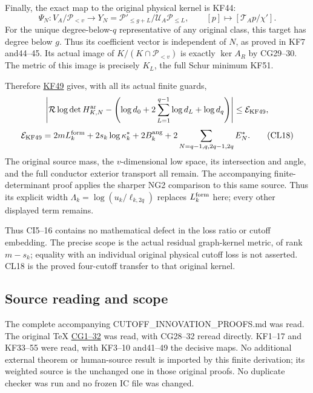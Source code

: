 \documentclass[11pt]{article}
\begin{document}
Finally, the exact map to the original physical kernel is KF44: \[
\Psi_N:V_A/\mathcal P_{<v}\longrightarrow
Y_N=\mathcal P'_{\le g+L}/\mathcal U_A\mathcal P_{\le L},
\qquad[p]\longmapsto[\mathcal T_Ap/\chi'].
\] For the unique degree-below-\(q\) representative of any original class, this target has degree below \(g\). Thus its coefficient vector is independent of \(N\), as proved in KF7 and44--45. Its actual image of \(K/(K\cap\mathcal P_{<v})\) is exactly \(\ker A_R\) by CG29--30. The metric of this image is precisely \(K_L\), the full Schur minimum KF51.

Therefore \href{https://github.com/KokunoYumeto/zeta-function-research-reader/blob/0fd693c844aad9117e30ec447c59864a28af10f3/workbenches/splitzero-tandem/continuations/20260921-native-spectral-real-pair/003/ACTUAL_KERNEL_FILTRATION_AND_GRAPH.tex}{KF49} gives, with all its actual finite guards, \[
\left|\mathcal R\log\det H_{K,N}^{\rm ar}
-\left(\log d_0+2\sum_{L=1}^{q-1}\log d_L+\log d_q\right)\right|
\le\mathcal E_{\rm KF49},
\] \[
\mathcal E_{\rm KF49}
=2mL_k^{\rm form}+2s_k\log\kappa_k^*
+2B_k^{\rm ang}+2\sum_{N=q-1,q,2q-1,2q}E_N^*.
\tag{CL18}
\] The original source mass, the \(v\)-dimensional low space, its intersection and angle, and the full conductor exterior transport all remain. The accompanying finite-determinant proof applies the sharper NG2 comparison to this same source. Thus its explicit width \(\Lambda_k=\log(u_k/\ell_{k,2q})\) replaces \(L_k^{\rm form}\) here; every other displayed term remains.

Thus CI5--16 contains no mathematical defect in the loss ratio or cutoff embedding. The precise scope is the actual residual graph-kernel metric, of rank \(m-s_k\); equality with an individual original physical cutoff loss is not asserted. CL18 is the proved four-cutoff transfer to that original kernel.

\subsection{Source reading and scope}\label{source-reading-and-scope}

The complete accompanying CUTOFF\_INNOVATION\_PROOFS.md was read. The original TeX \href{https://github.com/KokunoYumeto/zeta-function-research-reader/blob/0fd693c844aad9117e30ec447c59864a28af10f3/workbenches/splitzero-tandem/continuations/20260921-native-spectral-real-pair/003/COMPLETE_CONDUCTOR_GRAPH_METRIC.tex}{CG1--32} was read, with CG28--32 reread directly. KF1--17 and KF33--55 were read, with KF3--10 and41--49 the decisive maps. No additional external theorem or human-source result is imported by this finite derivation; its weighted source is the unchanged one in those original proofs. No duplicate checker was run and no frozen IC file was changed.
\end{document}
